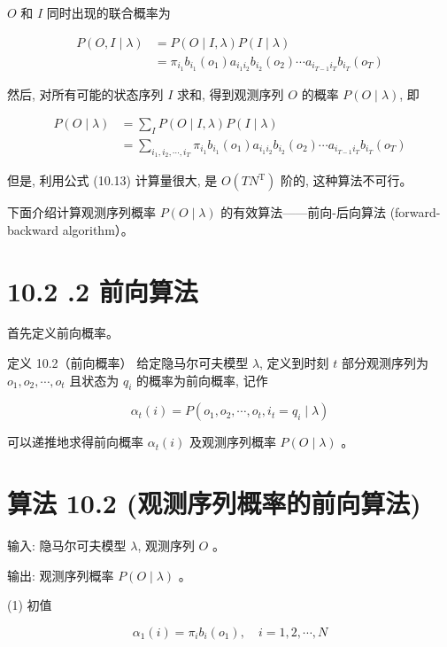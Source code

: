 \documentclass[10pt]{article}
\begin{document}
$O$ 和 $I$ 同时出现的联合概率为


\begin{align*}
P(O, I \mid \lambda) & =P(O \mid I, \lambda) P(I \mid \lambda) \\
& =\pi_{i_{1}} b_{i_{1}}\left(o_{1}\right) a_{i_{1} i_{2}} b_{i_{2}}\left(o_{2}\right) \cdots a_{i_{T-1} i_{T}} b_{i_{T}}\left(o_{T}\right) \tag{10.12}
\end{align*}


然后, 对所有可能的状态序列 $I$ 求和, 得到观测序列 $O$ 的概率 $P(O \mid \lambda)$, 即


\begin{align*}
P(O \mid \lambda) & =\sum_{I} P(O \mid I, \lambda) P(I \mid \lambda) \\
& =\sum_{i_{1}, i_{2}, \cdots, i_{T}} \pi_{i_{1}} b_{i_{1}}\left(o_{1}\right) a_{i_{1} i_{2}} b_{i_{2}}\left(o_{2}\right) \cdots a_{i_{T-1} i_{T}} b_{i_{T}}\left(o_{T}\right) \tag{10.13}
\end{align*}


但是, 利用公式 (10.13) 计算量很大, 是 $O\left(T N^{\mathrm{T}}\right)$ 阶的, 这种算法不可行。

下面介绍计算观测序列概率 $P(O \mid \lambda)$ 的有效算法——前向-后向算法 (forward-backward algorithm）。

\section*{10.2 .2 前向算法}
首先定义前向概率。

定义 10.2（前向概率） 给定隐马尔可夫模型 $\lambda$, 定义到时刻 $t$ 部分观测序列为 $o_{1}, o_{2}, \cdots, o_{t}$ 且状态为 $q_{i}$ 的概率为前向概率, 记作


\begin{equation*}
\alpha_{t}(i)=P\left(o_{1}, o_{2}, \cdots, o_{t}, i_{t}=q_{i} \mid \lambda\right) \tag{10.14}
\end{equation*}


可以递推地求得前向概率 $\alpha_{t}(i)$ 及观测序列概率 $P(O \mid \lambda)$ 。

\section*{算法 10.2 (观测序列概率的前向算法)}
输入: 隐马尔可夫模型 $\lambda$, 观测序列 $O$ 。

输出: 观测序列概率 $P(O \mid \lambda)$ 。

(1) 初值


\begin{equation*}
\alpha_{1}(i)=\pi_{i} b_{i}\left(o_{1}\right), \quad i=1,2, \cdots, N \tag{10.15}
\end{equation*}
\end{document}
